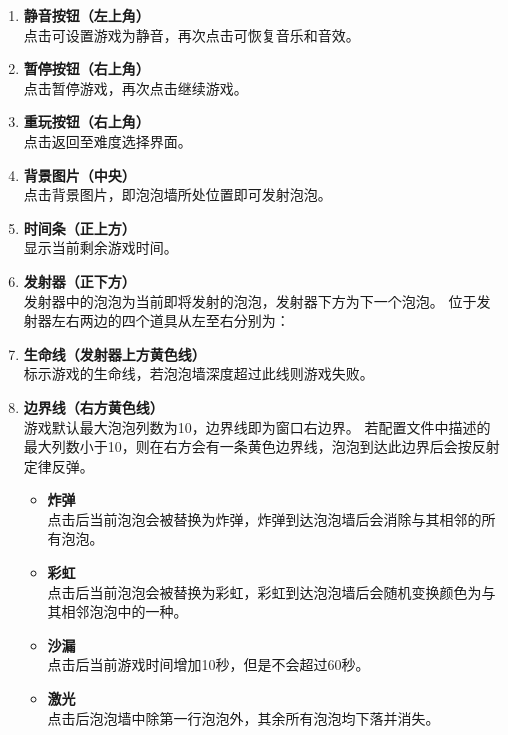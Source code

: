 \documentclass{article}
\begin{document}
        \begin{enumerate}
            \item \textbf{静音按钮（左上角）}\\
            点击可设置游戏为静音，再次点击可恢复音乐和音效。
            \item \textbf{暂停按钮（右上角）}\\
            点击暂停游戏，再次点击继续游戏。
            \item \textbf{重玩按钮（右上角）}\\
            点击返回至难度选择界面。
            \item \textbf{背景图片（中央）}\\
            点击背景图片，即泡泡墙所处位置即可发射泡泡。
            \item \textbf{时间条（正上方）}\\
            显示当前剩余游戏时间。
            \item \textbf{发射器（正下方）}\\
            发射器中的泡泡为当前即将发射的泡泡，发射器下方为下一个泡泡。
            位于发射器左右两边的四个道具从左至右分别为：
            \item \textbf{生命线（发射器上方黄色线）}\\
            标示游戏的生命线，若泡泡墙深度超过此线则游戏失败。
            \item \textbf{边界线（右方黄色线）}\\
            游戏默认最大泡泡列数为10，边界线即为窗口右边界。
            若配置文件中描述的最大列数小于10，则在右方会有一条黄色边界线，泡泡到达此边界后会按反射定律反弹。
            
            \begin{itemize}
                \item \textbf{炸弹} \\
                 点击后当前泡泡会被替换为炸弹，炸弹到达泡泡墙后会消除与其相邻的所有泡泡。
                \item \textbf{彩虹} \\
                点击后当前泡泡会被替换为彩虹，彩虹到达泡泡墙后会随机变换颜色为与其相邻泡泡中的一种。
                \item \textbf{沙漏} \\
                点击后当前游戏时间增加10秒，但是不会超过60秒。
                \item \textbf{激光} \\
                点击后泡泡墙中除第一行泡泡外，其余所有泡泡均下落并消失。
            \end{itemize}
        \end{enumerate}
\end{document}
